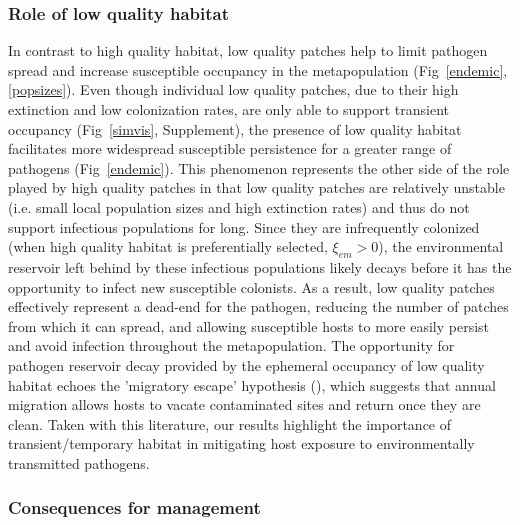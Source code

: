 \documentclass{article}
\begin{document}
\subsubsection*{Role of low quality habitat}

In contrast to high quality habitat, low quality patches help to limit pathogen spread and increase susceptible occupancy in the metapopulation (Fig~\ref{endemic}, \ref{popsizes}). 
Even though individual low quality patches, due to their high extinction and low colonization rates, are only able to support transient occupancy (Fig~\ref{simvis}, Supplement), the presence of low quality habitat facilitates more widespread susceptible persistence for a greater range of pathogens (Fig~\ref{endemic}).  
This phenomenon represents the other side of the role played by high quality patches in that low quality patches are relatively unstable (i.e. small local population sizes and high extinction rates) and thus do not support infectious populations for long.
Since they are infrequently colonized (when high quality habitat is preferentially selected, $\xi_{em} > 0$), the environmental reservoir left behind by these infectious populations likely decays before it has the opportunity to infect new susceptible colonists. 
As a result, low quality patches effectively represent a dead-end for the pathogen, reducing the number of patches from which it can spread, and allowing susceptible hosts to more easily persist and avoid infection throughout the metapopulation.
The opportunity for pathogen reservoir decay provided by the ephemeral occupancy of low quality habitat echoes the 'migratory escape' hypothesis (\cite{Loehle1995}), which suggests that annual migration allows hosts to vacate contaminated sites and return once they are clean.
Taken with this literature, our results highlight the importance of transient/temporary habitat in mitigating host exposure to environmentally transmitted pathogens.

\subsubsection*{Consequences for management}
\end{document}
